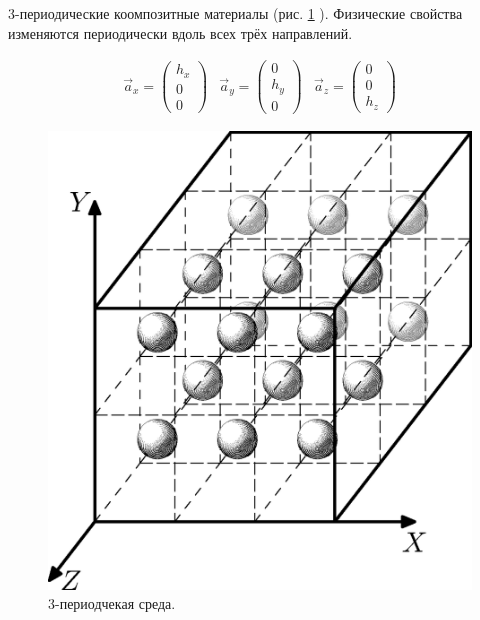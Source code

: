 3-периодические коомпозитные материалы (рис. 
\ref{images:three_period}
).  Физические свойства изменяются периодически вдоль всех трёх направлений.

\begin{equation}
    \begin{array}{ccc}
    \vec{a}_x = \left(\begin{array}{c}h_x\\0\\0\end{array}\right) & 
    \vec{a}_y = \left(\begin{array}{c}0\\h_y\\0\end{array}\right) & 
    \vec{a}_z = \left(\begin{array}{c}0\\0\\h_z\end{array}\right)
    \end{array}
\end{equation}

\begin{figure} [ht] 
    \center
    \includegraphics [scale=0.5] {images/three_period}
    \caption{3-периодчекая среда.} 
    \label{images:three_period}  
\end{figure}


